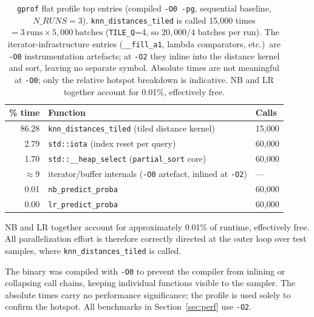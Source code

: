 \documentclass[12pt,a4paper]{article}
\begin{document}
\begin{table}[H]
  \centering
  \caption{\texttt{gprof} flat profile top entries (compiled \texttt{-O0 -pg},
           sequential baseline, $N\_RUNS=3$).
           \texttt{knn\_distances\_tiled} is called 15{,}000 times
           $= 3\ \text{runs} \times 5{,}000\ \text{batches}$
           (\texttt{TILE\_Q}=4, so $20{,}000 / 4$ batches per run).
           The iterator-infrastructure entries
           (\texttt{\_\_fill\_a1}, lambda comparators, etc.)\ are \texttt{-O0}
           instrumentation artefacts; at \texttt{-O2} they inline into the
           distance kernel and sort, leaving no separate symbol.
           Absolute times are not meaningful at \texttt{-O0}; only the
           relative hotspot breakdown is indicative.
           NB and LR together account for 0.01\%, effectively free.}
  \label{tab:gprof}
  \begin{tabular}{rll}
    \toprule
    \textbf{\% time} & \textbf{Function} & \textbf{Calls} \\
    \midrule
    86.28 & \texttt{knn\_distances\_tiled} (tiled distance kernel) & 15{,}000 \\
     2.79 & \texttt{std::iota} (index reset per query)             & 60{,}000 \\
     1.70 & \texttt{std::\_\_heap\_select} (\texttt{partial\_sort} core) & 60{,}000 \\
    $\approx$9 & iterator/buffer internals (\texttt{-O0} artefact, inlined at \texttt{-O2}) & --- \\
     0.01 & \texttt{nb\_predict\_proba}                            & 60{,}000 \\
     0.00 & \texttt{lr\_predict\_proba}                            & 60{,}000 \\
    \bottomrule
  \end{tabular}
\end{table}

\noindent
NB and LR together account for approximately 0.01\% of runtime, effectively free.
All parallelization effort is therefore correctly directed at the outer loop
over test samples, where \texttt{knn\_distances\_tiled} is called.

The binary was compiled with \texttt{-O0} to prevent the compiler from
inlining or collapsing call chains, keeping individual functions visible
to the sampler. The absolute times carry no performance significance;
the profile is used solely to confirm the hotspot. All benchmarks in
Section~\ref{sec:perf} use \texttt{-O2}.
\end{document}
